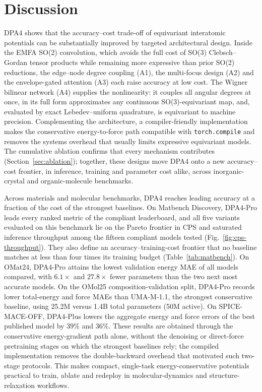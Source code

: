 \section{Discussion}
\label{sec:discussion}

DPA4 shows that the accuracy--cost trade-off of equivariant interatomic potentials can be substantially improved by targeted architectural design.
Inside the EMFA SO(2) convolution, which avoids the full cost of SO(3) Clebsch--Gordan tensor products while remaining more expressive than prior SO(2) reductions, the edge--node degree coupling (A1), the multi-focus design (A2) and the envelope-gated attention (A3) each raise accuracy at low cost.
The Wigner bilinear network (A4) supplies the nonlinearity: it couples all angular degrees at once, in its full form approximates any continuous SO(3)-equivariant map, and, evaluated by exact Lebedev--uniform quadrature, is equivariant to machine precision.
Complementing the architecture, a compiler-friendly implementation makes the conservative energy-to-force path compatible with \texttt{torch.compile} and removes the systems overhead that usually limits expressive equivariant models.
The cumulative ablation confirms that every mechanism contributes (Section~\ref{sec:ablation}); together, these designs move DPA4 onto a new accuracy--cost frontier, in inference, training and parameter cost alike, across inorganic-crystal and organic-molecule benchmarks.

Across materials and molecular benchmarks, DPA4 reaches leading accuracy at a fraction of the cost of the strongest baselines.
On Matbench Discovery, DPA4-Pro leads every ranked metric of the compliant leaderboard, and all five variants evaluated on this benchmark lie on the Pareto frontier in CPS and saturated inference throughput among the fifteen compliant models tested (Fig.~\ref{fig:cps-throughput}).
They also define an accuracy--training-cost frontier that no baseline matches at less than four times its training budget (Table~\ref{tab:matbench}).
On OMat24, DPA4-Pro attains the lowest validation energy MAE of all models compared, with $6.1\times$ and $27.8\times$ fewer parameters than the two next most accurate models.
On the OMol25 composition-validation split, DPA4-Pro records lower total-energy and force MAEs than UMA-M-1.1, the strongest conservative baseline, using 25.2M versus 1.4B total parameters (50M active).
On SPICE-MACE-OFF, DPA4-Plus lowers the aggregate energy and force errors of the best published model by $39\%$ and $36\%$.
These results are obtained through the conservative energy-gradient path alone, without the denoising or direct-force pretraining stages on which the strongest baselines rely; the compiled implementation removes the double-backward overhead that motivated such two-stage protocols.
This makes compact, single-task energy-conservative potentials practical to train, ablate and redeploy in molecular-dynamics and structure-relaxation workflows.

